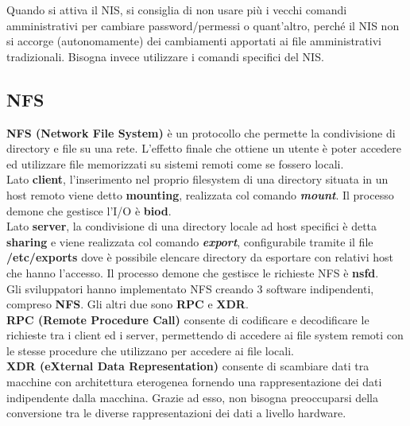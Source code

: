         Quando si attiva il NIS, si consiglia di non usare più i vecchi comandi amministrativi per
        cambiare password/permessi o quant’altro, perché il NIS non si accorge (autonomamente) dei
        cambiamenti apportati ai file amministrativi tradizionali. Bisogna invece utilizzare i comandi
        specifici del NIS.

    \subsection{NFS}

        \textbf{NFS (Network File System)} è un protocollo che permette la condivisione di directory e file su
        una rete. L’effetto finale che ottiene un utente è poter accedere ed utilizzare file memorizzati su
        sistemi remoti come se fossero locali.\\

        Lato \textbf{client}, l’inserimento nel proprio filesystem di una directory situata in un host remoto
        viene detto \textbf{mounting}, realizzata col comando \textbf{\emph{mount}}. Il processo demone che gestisce l’I/O è
        \textbf{biod}.\\

        Lato \textbf{server}, la condivisione di una directory locale ad host specifici è detta \textbf{sharing} e viene
        realizzata col comando \textbf{\emph{export}}, configurabile tramite il file \textbf{/etc/exports} dove è possibile
        elencare directory da esportare con relativi host che hanno l’accesso. Il processo demone che
        gestisce le richieste NFS è \textbf{nsfd}.\\

        Gli sviluppatori hanno implementato NFS creando 3 software indipendenti, compreso \textbf{NFS}.
        Gli altri due sono \textbf{RPC} e \textbf{XDR}.\\

        \textbf{RPC (Remote Procedure Call)} consente di codificare e decodificare le richieste tra i client ed
        i server, permettendo di accedere ai file system remoti con le stesse procedure che utilizzano
        per accedere ai file locali.\\

        \textbf{XDR (eXternal Data Representation)} consente di scambiare dati tra macchine con
        architettura eterogenea fornendo una rappresentazione dei dati indipendente dalla macchina.
        Grazie ad esso, non bisogna preoccuparsi della conversione tra le diverse rappresentazioni dei
        dati a livello hardware.
    
